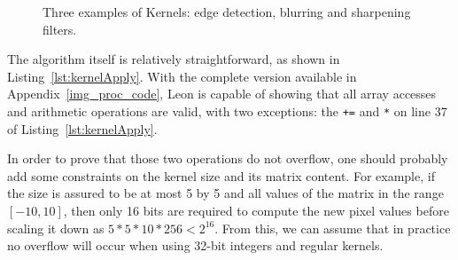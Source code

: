 \documentclass[a4paper,twoside]{article}
\newcommand{\InlineS}[1]{\lstinline[language=Leon]|#1|}
\newcommand{\RefApp}[1]{Appendix~\ref{#1}}
\newcommand{\RefCode}[1]{Listing~\ref{#1}}
\begin{document}
\begin{figure}[h!]
\caption{Three examples of Kernels: edge detection, blurring and sharpening filters.}
\label{fig:kernels}
\end{figure}

The algorithm itself is relatively straightforward, as shown in
\RefCode{lst:kernelApply}. With the complete version available in
\RefApp{img_proc_code}, Leon is capable of showing that all array accesses and
arithmetic operations are valid, with two exceptions: the \InlineS{+=} and
\InlineS{*} on line 37 of \RefCode{lst:kernelApply}.

In order to prove that those two operations do not overflow, one should probably
add some constraints on the kernel size and its matrix content. For example, if
the size is assured to be at most 5 by 5 and all values of the matrix in the
range $[-10, 10]$, then only 16 bits are required to compute the new pixel
values before scaling it down as $5 * 5 * 10 * 256 < 2^{16}$. From this, we can
assume that in practice no overflow will occur when using 32-bit integers and
regular kernels.
\end{document}
